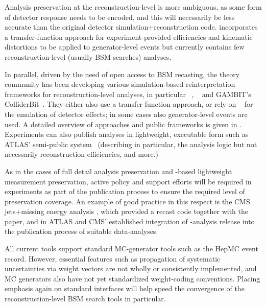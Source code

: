 \documentclass[11pt]{article}
\begin{document}
Analysis preservation at the reconstruction-level is more ambiguous, as some form of detector response needs to be encoded, and this will necessarily be less accurate than the original detector simulation+reconstruction code.
\rivet incorporates a transfer-function approach for experiment-provided efficiencies and kinematic distortions to be applied to generator-level events but currently contains few reconstruction-level (usually \gls{BSM} searches) analyses.

In parallel, driven by the need of open access to \gls{BSM} recasting, the theory community has been developing various simulation-based reinterpretation frameworks for reconstruction-level analyses, in particular \checkmate~\cite{Drees:2013wra,Dercks:2016npn}, \madanalysis~\cite{Dumont:2014tja,Conte:2018vmg} and GAMBIT's ColliderBit~\cite{GAMBIT:2017qxg}. They either also use a transfer-function approach, or rely on \delphes~\cite{deFavereau:2013fsa} for the emulation of detector effects; in some cases also generator-level events are used. A detailed overview of approaches and public frameworks is given in \cite{LHCReinterpretationForum:2020xtr}.
%
Experiments can also publish analyses in lightweight, executable form such as \gls{ATLAS}' semi-public \simpleanalysis system~\cite{atlas:simpleanalysis} 
(describing in particular, the analysis logic but not necessarily reconstruction efficiencies, and more.)

As in the cases of full detail analysis preservation and \rivet-based lightweight measurement preservation, active policy and support efforts will be required in experiments as part of the publication process to ensure the required level of preservation coverage. An example of good practice in this respect is the \gls{CMS} jets+missing energy analysis \cite{CMS:2021far}, which provided a \madanalysis recast code \cite{Albert:2774586,DVN/IRF7ZL_2021} together with the paper, and in \gls{ATLAS} and \gls{CMS}' established integration of \rivet-analysis release into the publication process of suitable data-analyses.

All current tools support standard MC-generator tools such as the HepMC event record. However, essential features such as propagation of systematic uncertainties via weight vectors are not wholly or consistently implemented, and MC generators also have not yet standardized weight-coding conventions. Placing emphasis again on standard interfaces will help speed the convergence of the reconstruction-level \gls{BSM} search tools in particular.
\end{document}
